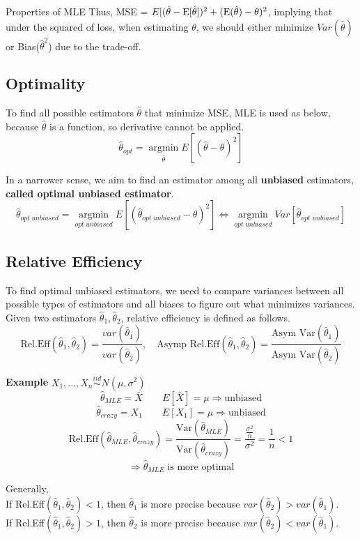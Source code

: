 \documentclass[12pt]{article}
\newcommand{\E}{{\rm E}}
\begin{document}
\begin{section}{Properties of MLE}
Thus, MSE = $E[(\hat{\theta} - \E [\hat{\theta}])^2 + (\E (\hat{\theta})-\theta)^2$, implying that under the squared of loss, when estimating $\theta$, we should either minimize $Var(\hat{\theta})$ or Bias($\hat{\theta}^2$) due to the trade-off.

\subsection{Optimality}
To find all possible estimators $\hat{\theta}$ that minimize MSE, MLE is used as below, because $\hat{\theta}$ is a function, so derivative cannot be applied.
$$\hat{\theta}_{opt} = \operatorname*{argmin}_{\hat{\theta}} E[(\hat{\theta}-\theta)^2]$$

In a narrower sense, we aim to find an estimator among all \textbf{unbiased} estimators, \textbf{called optimal unbiased estimator}. \\
$$\hat{\theta}_{opt \; unbiased} = \operatorname*{argmin}_{opt \; unbiased} E[(\hat{\theta}_{opt \; unbiased}-\theta)^2] \Leftrightarrow \operatorname*{argmin}_{opt \; unbiased} Var[\hat{\theta}_{opt \; unbiased}]$$

\subsection{Relative Efficiency}
To find optimal unbiased estimators, we need to compare variances between all possible types of estimators and all biases to figure out what minimizes variances.
Given two estimators $\hat{\theta}_1, \hat{\theta}_2$, relative efficiency is defined as follows. 
$$\text{Rel.Eff}(\hat{\theta}_1,\hat{\theta}_2) = \frac{var(\hat{\theta}_1)}{var(\hat{\theta}_2)}, \quad \text{Asymp Rel.Eff}(\hat{\theta}_1,\hat{\theta}_2) = \frac{\text{Asym Var}(\hat{\theta}_1)}{\text{Asym Var}(\hat{\theta}_2)}$$

\textbf{Example} $X_1,...,X_n \stackrel{iid}{\sim} N(\mu,\sigma^2)$\\
$$\hat{\theta}_{MLE} = \bar{X} \qquad E[\bar{X}] = \mu \Rightarrow \text{unbiased}$$
$$\hat{\theta}_{crazy} = X_1 \qquad E[X_1] = \mu \Rightarrow \text{unbiased}$$ 
$$\text{Rel.Eff}(\hat{\theta}_{MLE},\hat{\theta}_{crazy}) = \frac{\text{Var}(\hat{\theta}_{MLE})}{\text{Var}(\hat{\theta}_{crazy})} = \frac{\frac{\sigma^2}{n}}{\sigma^2} = \frac{1}{n} < 1$$
$$\Rightarrow \hat{\theta}_{MLE} \;\text{is more optimal}$$

Generally, \\
If Rel.Eff$(\hat{\theta}_{1},\hat{\theta}_{2}) < 1$, then $\hat{\theta}_1$ is more precise because $var(\hat{\theta}_2) > var(\hat{\theta}_1)$.\\
If Rel.Eff$(\hat{\theta}_{1},\hat{\theta}_{2}) > 1$, then $\hat{\theta}_2$ is more precise because $var(\hat{\theta}_2) < var(\hat{\theta}_1)$. \\


\end{section}
\end{document}

